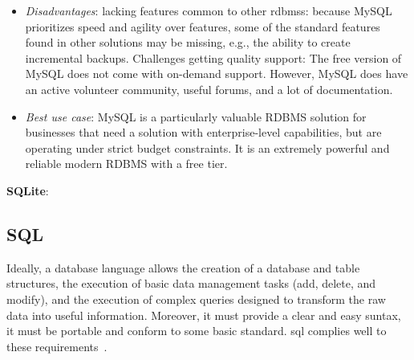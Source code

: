 \begin{item-c}
\begin{itemize}
      highly compatible with many other database systems.
    \item \emph{Disadvantages}: lacking features common to other \glspl{rdbms}:
      because MySQL prioritizes speed and agility over features, some of the
      standard features found in other solutions may be missing, e.g., the
      ability to create incremental backups. Challenges getting quality support:
      The free version of MySQL does not come with on-demand support. However,
      MySQL does have an active volunteer community, useful forums, and a lot of
      documentation.
    \item \emph{Best use case}: MySQL is a particularly valuable RDBMS solution
      for businesses that need a solution with enterprise-level capabilities,
      but are operating under strict budget constraints. It is an extremely
      powerful and reliable modern RDBMS with a free tier.
  \end{itemize}
\item \textbf{SQLite}:
\end{item-c}

\subsection{SQL}
\label{sec:sql}
Ideally, a database language allows the creation of a database and table
structures, the execution of basic data management tasks (add, delete, and
modify), and the execution of complex queries designed to transform the raw data
into useful information. Moreover, it must provide a clear and easy suntax, it
must be portable and conform to some basic standard. \gls{sql} complies well to
these requirements~\cite{coronel2016database}.

